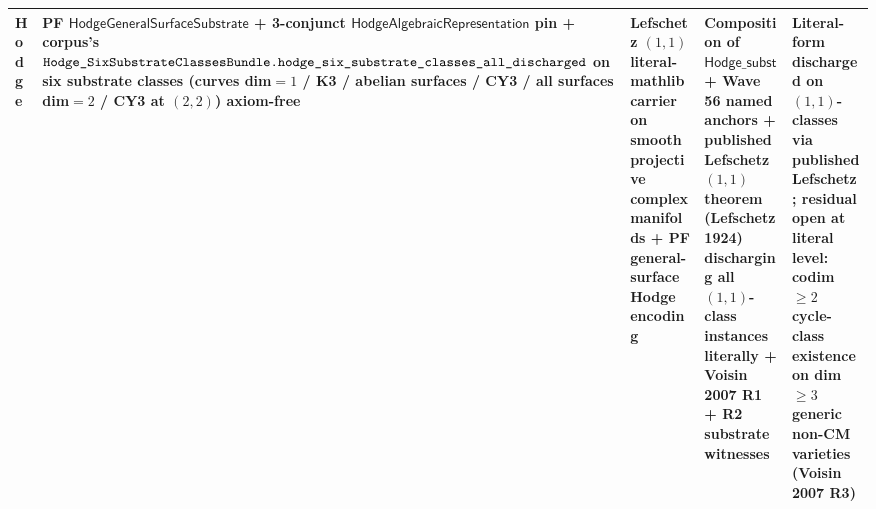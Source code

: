 \documentclass[11pt,a4paper]{amsart}
\theoremstyle{plain}
\theoremstyle{definition}
\begin{document}
\begin{center}
\begin{tabular}{|p{2.4cm}|p{3.2cm}|p{3.4cm}|p{3.1cm}|p{2.6cm}|}
Hodge & PF $\textsf{HodgeGeneralSurfaceSubstrate}$ + 3-conjunct $\textsf{HodgeAlgebraicRepresentation}$ pin + corpus's $\texttt{Hodge\_SixSubstrateClassesBundle.}\linebreak\texttt{hodge\_six\_substrate\_classes\_all\_discharged}$ on six substrate classes (curves dim$=1$ / K3 / abelian surfaces / CY3 / all surfaces dim$=2$ / CY3 at $(2,2)$) axiom-free & Lefschetz $(1,1)$ literal-mathlib carrier on smooth projective complex manifolds + PF general-surface Hodge encoding & Composition of $\textsf{Hodge\_substrate\_capstone\_holds}$ + Wave 56 named anchors + \textbf{published Lefschetz $(1,1)$ theorem (Lefschetz 1924)} discharging all $(1,1)$-class instances literally + Voisin 2007 R1 + R2 substrate witnesses & \textbf{Literal-form discharged on $(1,1)$-classes via published Lefschetz; residual open at literal level: codim $\geq 2$ cycle-class existence on dim $\geq 3$ generic non-CM varieties (Voisin 2007 R3)} \\
\hline
\end{tabular}
\end{center}
\end{document}
